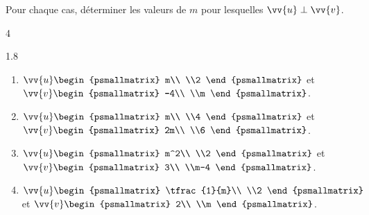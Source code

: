 \documentclass[main.tex]{subfiles}
\begin{document}
\begin{exercise} Pour chaque cas, déterminer les valeurs de $m$ pour lesquelles $\vv{u}\perp\vv{v}$.\vspace{-0.5em}
\begin{multicols}{4}
	\begin{spacing}{1.8}
		\begin{enumerate}[label=\arabic*),leftmargin=*]
			\item  $ \vv{u}
			\displaystyle\begin{psmallmatrix}
				m\\ \\2
			\end{psmallmatrix}$ et $\vv{v}\begin{psmallmatrix}
				-4\\ \\m
			\end{psmallmatrix}$. 
			\item  $ \vv{u}
			\displaystyle\begin{psmallmatrix}
				m\\ \\4
			\end{psmallmatrix}$ et $\vv{v}\begin{psmallmatrix}
				2m\\ \\6
			\end{psmallmatrix}$. 
			\item  $ \vv{u}
			\displaystyle\begin{psmallmatrix}
				m^2\\ \\2
			\end{psmallmatrix}$ et $\vv{v}\begin{psmallmatrix}
				3\\ \\m-4
			\end{psmallmatrix}$. 
			\item  $ \vv{u}
			\displaystyle\begin{psmallmatrix}
				\tfrac{1}{m}\\ \\2
			\end{psmallmatrix}$ et $\vv{v}\begin{psmallmatrix}
				2\\ \\m
			\end{psmallmatrix}$. 
		\end{enumerate}	
	\end{spacing}
\end{multicols} 
\vspace{-0.5em}
\end{exercise}
\end{document}
